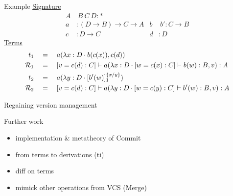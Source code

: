 \documentclass[ignorenonframetext,red]{beamer}
\begin{document}
\begin{frame}{Example}
  \underline{Signature}
  \begin{align*}
    A&\ B\ C\ D : * \\
    a &: (D\to B)\to C\to A     & b&\ b' : C\to B \\
    c &: D\to C                 & d &: D
  \end{align*}
  \underline{Terms}
  \begin{align*}
    t_1\quad&=\quad
    {a}({{\lambda{x}:{D}\cdot {b}({{c}({x})})},{{c}({d})}}) \\
    \mathcal{R}_1\quad&=\quad
    [{v}={{c}({d}) : C}] \vdash {a}({{\lambda{x}:{D}\cdot
        [{w}={{c}({x}) : C}]\vdash {b}({w}) : B},{v}}) : A \\
    t_2 \quad&=\quad
    {a}({\lambda{y}:{D}\cdot {[{b'}({w})]_{1}^{{}\{{x}/{y}\}}}}) \\
    \mathcal{R}_2\quad&=\quad
    [{v}={{c}({d}) : C}] \vdash {a}({{\lambda{y}:{D}\cdot
        [{w}={{c}({y}) : C}]\vdash {b'}({w}) : B},{v}}) : A
  \end{align*}
\end{frame}

\begin{frame}{Regaining version management}

\end{frame}

\begin{frame}{Further work}
  \begin{itemize}
  \item implementation \& metatheory of \textsf{Commit}
  \item from terms to derivations (\textsf{ti})
  \item \textsf{diff} on terms
  \item mimick other operations from VCS (\textsf{Merge})
  \end{itemize}
\end{frame}
\end{document}
